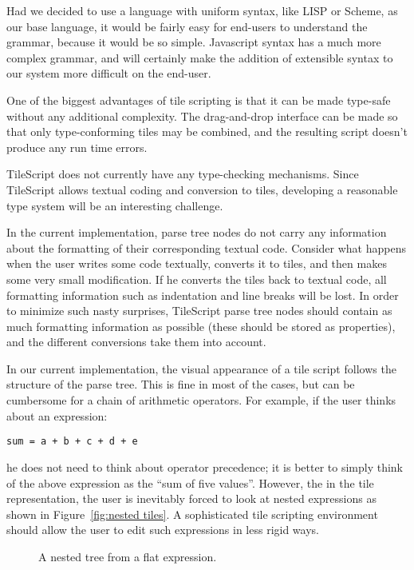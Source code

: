 Had we decided to use a language with uniform syntax, like LISP or Scheme,
as our base language, it would be fairly easy for end-users to understand the
grammar, because it would be so simple.
Javascript syntax has a much more complex grammar, and will certainly make
the addition of extensible syntax to our system more difficult on the end-user.

  One of the biggest advantages of tile scripting is that it can be
made type-safe without any additional complexity.
The drag-and-drop interface can be made so that only
type-conforming tiles may be combined, and the resulting script
doesn't produce any run time errors.

  TileScript does not currently have any type-checking mechanisms.
Since TileScript allows textual coding and conversion to tiles, developing a
reasonable type system will be an interesting challenge.


  In the current implementation, parse tree nodes do not carry any
information about the formatting of their corresponding textual code.  Consider what happens when the user writes
some code textually, converts it to tiles, and then makes some very small
modification.  If he converts the tiles back to textual code, all
formatting information such as indentation and line breaks will be lost.
In order to minimize such nasty surprises, TileScript parse tree nodes should contain as much formatting
information as possible (these should be stored as properties), and the different conversions
take them into account.

  In our current implementation, the visual appearance of a tile
script follows the structure of the parse tree.  This is fine in most of the
cases, but can be cumbersome for a chain of arithmetic operators.  For
example, if the user thinks about an expression:
\begin{center}
{\tt sum = a + b + c + d + e}
\end{center}
he does not need to think about operator precedence; it is better
to simply think of the above expression as the ``sum of five values''.
However, the in the tile representation, the user is inevitably forced
to look at nested expressions as shown in Figure~\ref{fig:nested
tiles}.  A sophisticated tile scripting environment should allow the
user to edit such expressions in less rigid ways.

\begin{figure}[tp]
\centering
{}
\caption{A nested tree from a flat expression.}
\label{fig:nested tiles}
\end{figure}

